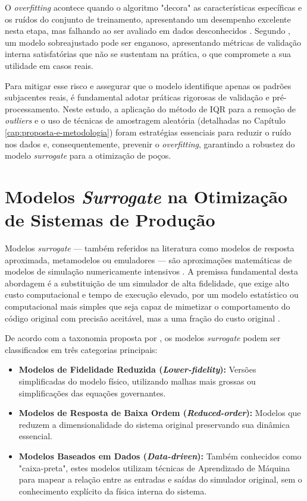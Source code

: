 O \textit{overfitting} acontece quando o algoritmo "decora" as características específicas e os ruídos do conjunto de treinamento, apresentando um desempenho excelente nesta etapa, mas falhando ao ser avaliado em dados desconhecidos \cite{Asnicar_2024_MachineLearning}. Segundo , um modelo sobreajustado pode ser enganoso, apresentando métricas de validação interna satisfatórias que não se sustentam na prática, o que compromete a sua utilidade em casos reais.

Para mitigar esse risco e assegurar que o modelo identifique apenas os padrões subjacentes reais, é fundamental adotar práticas rigorosas de validação e pré-processamento. Neste estudo, a aplicação do método de \gls{IQR} para a remoção de \textit{outliers} e o uso de técnicas de amostragem aleatória (detalhadas no Capítulo \ref{cap:proposta-e-metodologia}) foram estratégias essenciais para reduzir o ruído nos dados e, consequentemente, prevenir o \textit{overfitting}, garantindo a robustez do modelo \textit{surrogate} para a otimização de poços.

\section{Modelos \textit{Surrogate} na Otimização de Sistemas de Produção}
\label{sec:surrogate}

Modelos \textit{surrogate} — também referidos na literatura como modelos de resposta aproximada, metamodelos ou emuladores — são aproximações matemáticas de modelos de simulação numericamente intensivos \cite{Asher_2015_SurrogateReview}. A premissa fundamental desta abordagem é a substituição de um simulador de alta fidelidade, que exige alto custo computacional e tempo de execução elevado, por um modelo estatístico ou computacional mais simples que seja capaz de mimetizar o comportamento do código original com precisão aceitável, mas a uma fração do custo original \cite{Asher_2015_SurrogateReview, Sturek_2025_SurrogateReview}.

De acordo com a taxonomia proposta por , os modelos \textit{surrogate} podem ser classificados em três categorias principais:
\begin{itemize}
    \item \textbf{Modelos de Fidelidade Reduzida (\textit{Lower-fidelity}):} Versões simplificadas do modelo físico, utilizando malhas mais grossas ou simplificações das equações governantes.
    \item \textbf{Modelos de Resposta de Baixa Ordem (\textit{Reduced-order}):} Modelos que reduzem a dimensionalidade do sistema original preservando sua dinâmica essencial.
    \item \textbf{Modelos Baseados em Dados (\textit{Data-driven}):} Também conhecidos como "caixa-preta", estes modelos utilizam técnicas de Aprendizado de Máquina para mapear a relação entre as entradas e saídas do simulador original, sem o conhecimento explícito da física interna do sistema.
\end{itemize}

